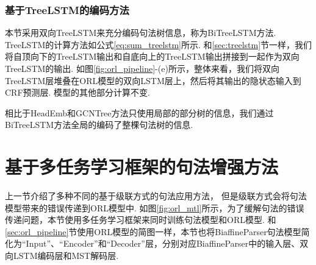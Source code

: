 \subsubsection{基于TreeLSTM的编码方法}
本节采用双向TreeLSTM来充分编码句法树信息，称为BiTreeLSTM方法. TreeLSTM的计算方法如公式\ref{eq:sum_treelstm}所示. 和\ref{sec:treelstm}节一样，我们将自顶向下的TreeLSTM输出和自底向上的TreeLSTM输出拼接到一起作为双向TreeLSTM的输出.
%
%
如图\ref{fig:orl_pipeline}-(e)所示，整体来看，我们将双向TreeLSTM层堆叠在ORL模型的双向LSTM层上，然后将其输出的隐状态输入到CRF预测层. 模型的其他部分计算不变.

相比于HeadEmb和GCNTree方法只使用局部的部分树的信息，我们通过BiTreeLSTM方法全局的编码了整棵句法树的信息.

\section{基于多任务学习框架的句法增强方法}
\label{sec:orl_mtl}
%
上一节介绍了多种不同的基于级联方式的句法应用方法，
但是级联方式会将句法模型带来的错误传递到ORL模型中.
如图\ref{fig:orl_mtl}所示，为了缓解句法的错误传递问题，本节使用多任务学习框架来同时训练句法模型和ORL模型. 和\ref{sec:orl_pipeline}节使用ORL模型的简图一样，本节也将BiaffineParser句法模型简化为“Input”、“Encoder”和“Decoder”层，分别对应BiaffineParser中的输入层、双向LSTM编码层和MST解码层.

